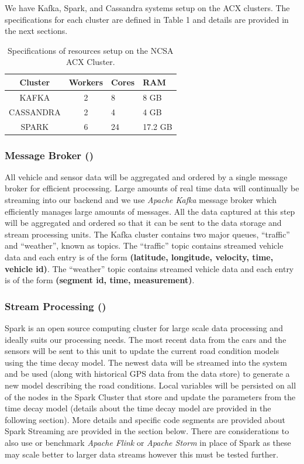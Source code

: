 \documentclass{vldb}
\begin{document}
We have Kafka, Spark, and Cassandra systems setup on the ACX clusters. The specifications for each cluster are defined in Table 1 and details are provided in the next sections. 

\begin{table}
\centering
\caption{Specifications of resources setup on the NCSA ACX Cluster.}
\begin{tabular}{|c|c|l|l|} \hline
Cluster&Workers&Cores&RAM\\ \hline
KAFKA & 2 & 8 & 8 GB\\ \hline
CASSANDRA & 2 & 4 & 4 GB\\ \hline
SPARK & 6 & 24 & 17.2 GB \\ \hline
\end{tabular}
\end{table}

\subsubsection{Message Broker ()}
All vehicle and sensor data will be aggregated and ordered by a single message broker for efficient processing. Large amounts of real time data will continually be streaming into our backend and we use \textit{Apache Kafka} message broker which efficiently manages large amounts of messages. All the data captured at this step will be aggregated and ordered so that it can be sent to the data storage and stream processing units. The Kafka cluster contains two major queues, “traffic” and “weather”, known as topics. The “traffic” topic contains streamed vehicle data and each entry is of the form \textbf{(latitude, longitude, velocity, time, vehicle id)}. The “weather” topic contains streamed vehicle data and each entry is of the form \textbf{(segment id, time, measurement)}.

\subsubsection{Stream Processing ()}
Spark is an open source computing cluster for large scale data processing and ideally suits our processing needs. The most recent data from the cars and the sensors will be sent to this unit to update the current road condition models using the time decay model. The newest data will be streamed into the system and be used (along with historical GPS data from the data store) to generate a new model describing the road conditions. Local variables will be persisted on all of the nodes in the Spark Cluster that store and update the parameters from the time decay model (details about the time decay model are provided in the following section). More details and specific code segments are provided about Spark Streaming are provided in the section below. There are considerations to also use or benchmark \textit{Apache Flink} or \textit{Apache Storm} in place of Spark as these may scale better to larger data streams however this must be tested further. 
\end{document}
